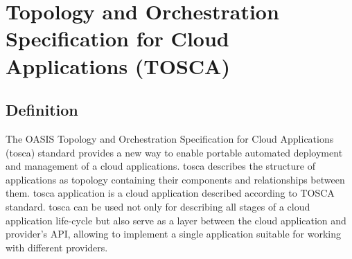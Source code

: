 \section{Topology and Orchestration Specification for Cloud	Applications (TOSCA)} \label{sec:tosca}
\subsection*{Definition}
The OASIS \cite{oasis} Topology and Orchestration Specification for Cloud Applications (\gls{tosca}) standard provides a new way to enable portable automated deployment and management of a cloud applications.
\gls{tosca} describes the structure of applications as topology containing their components and relationships between them.
\gls{tosca} application is a cloud application described according to TOSCA standard.
\gls{tosca} can be used not only for describing all stages of a cloud application life-cycle but also serve as a layer between the cloud application and provider's API, allowing to implement a single application suitable for working with different providers. 
